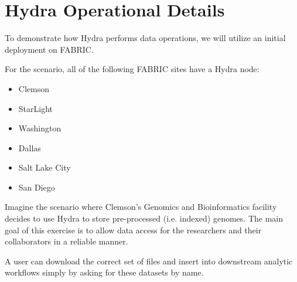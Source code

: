 \section{Hydra Operational Details} \label{sec:data-operations}

To demonstrate how Hydra performs data operations, we will utilize an initial deployment on FABRIC\cite{}.

For the scenario, all of the following FABRIC sites have a Hydra node:
\begin{itemize}
    \item Clemson
    \item StarLight
    \item Washington
    \item Dallas
    \item Salt Lake City
    \item San Diego
\end{itemize}


Imagine the scenario where Clemson's Genomics and Bioinformatics facility decides to use Hydra to store pre-processed (i.e. indexed) genomes. The main goal of this exercise is to allow data access for the researchers and their collaborators in a reliable manner.

A user can download the correct set of files and insert into downstream analytic workflows simply by asking for these datasets by name. 






